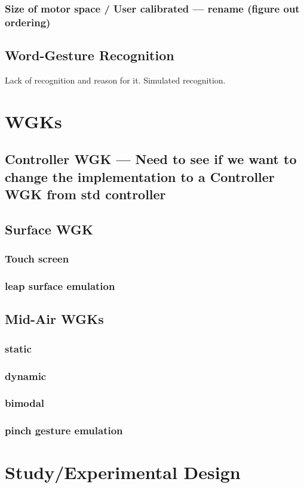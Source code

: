 \subsubsection{Size of motor space / User calibrated --- rename (figure out ordering)}

\subsection{Word-Gesture Recognition}

Lack of recognition and reason for it. Simulated recognition.

\section{WGKs}

\subsection{Controller WGK --- Need to see if we want to change the implementation to a Controller WGK from std controller}

\subsection{Surface WGK}

\subsubsection{Touch screen}

\subsubsection{leap surface emulation}

\subsection{Mid-Air WGKs}

\subsubsection{static}

\subsubsection{dynamic}

\subsubsection{bimodal}

\subsubsection{pinch gesture emulation}

\section{Study/Experimental Design}
